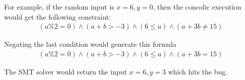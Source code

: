 \documentclass[12pt,a4paper]{article}
\begin{document}
\begin{enumerate}
\begin{enumerate}
For example, if the random input is $x = 6, y = 0$, then the concolic execution would get the following constraint:
\begin{align*}
(a\%2 = 0) \wedge (a + b > -3) \wedge (6 \leq a) \wedge (a + 3b \neq 15)
\end{align*}

Negating the last condition would generate this formula
\begin{align*}
(a\%2 = 0) \wedge (a + b > -3) \wedge (6 \leq a) \wedge (a + 3b = 15)
\end{align*}

The SMT solver would return the input $x = 6, y = 3$ which hits the bug. 

\color{black}

\end{enumerate}
\end{enumerate}
\end{document}
